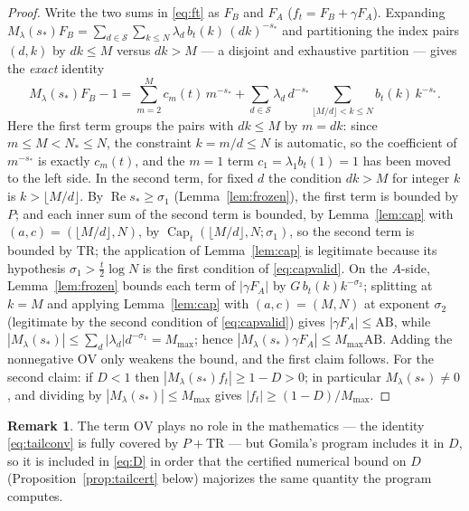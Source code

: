 \documentclass[11pt]{article}
\theoremstyle{definition}
\newtheorem{remark}[theorem]{Remark}
\newcommand{\calS}{\mathcal{S}}
\newcommand{\CapT}{\operatorname{Cap}}
\DeclareMathOperator{\Rea}{Re}
\begin{document}
\begin{proof}
Write the two sums in \eqref{eq:ft} as $F_B$ and $F_A$
($f_t=F_B+\gamma F_A$). Expanding
$M_\lambda(s_*)F_B=\sum_{d\in\calS}\sum_{k\le N}
\lambda_d\,b_t(k)\,(dk)^{-s_*}$ and partitioning the index pairs
$(d,k)$ by $dk\le M$ versus $dk>M$ --- a disjoint and exhaustive
partition --- gives the \emph{exact} identity
\begin{equation}\label{eq:tailconv}
M_\lambda(s_*)F_B-1
=\sum_{m=2}^{M}c_m(t)\,m^{-s_*}
+\sum_{d\in\calS}\lambda_d\,d^{-s_*}
\sum_{\lfloor M/d\rfloor<k\le N}b_t(k)\,k^{-s_*} .
\end{equation}
Here the first term groups the pairs with $dk\le M$ by $m=dk$: since
$m\le M<N_*\le N$, the constraint $k=m/d\le N$ is automatic, so the
coefficient of $m^{-s_*}$ is exactly $c_m(t)$, and the $m=1$ term
$c_1=\lambda_1b_t(1)=1$ has been moved to the left side. In the
second term, for fixed $d$ the condition $dk>M$ for integer $k$ is
$k>\lfloor M/d\rfloor$. By $\Rea s_*\ge\sigma_1$
(Lemma~\ref{lem:frozen}), the first term is bounded by $P$; and
each inner sum of the second term is bounded, by
Lemma~\ref{lem:cap} with $(a,c)=(\lfloor M/d\rfloor,N)$, by
$\CapT_t(\lfloor M/d\rfloor,N;\sigma_1)$, so the second term is
bounded by $\mathrm{TR}$; the application of Lemma~\ref{lem:cap} is
legitimate because its hypothesis $\sigma_1>\frac t2\log N$ is the
first condition of \eqref{eq:capvalid}. On the $A$-side,
Lemma~\ref{lem:frozen} bounds each term of $|\gamma F_A|$ by
$G\,b_t(k)k^{-\sigma_2}$; splitting at $k=M$ and applying
Lemma~\ref{lem:cap} with $(a,c)=(M,N)$ at exponent $\sigma_2$
(legitimate by the second condition of \eqref{eq:capvalid}) gives
$|\gamma F_A|\le\mathrm{AB}$, while
$|M_\lambda(s_*)|\le\sum_d|\lambda_d|d^{-\sigma_1}=M_{\max}$;
hence $|M_\lambda(s_*)\gamma F_A|\le M_{\max}\mathrm{AB}$. Adding
the nonnegative $\mathrm{OV}$ only weakens the bound, and the first
claim follows. For the second claim: if $D<1$ then
$|M_\lambda(s_*)f_t|\ge1-D>0$; in particular
$M_\lambda(s_*)\neq0$, and dividing by
$|M_\lambda(s_*)|\le M_{\max}$ gives
$|f_t|\ge(1-D)/M_{\max}$.
\end{proof}

\begin{remark}
The term $\mathrm{OV}$ plays no role in the mathematics --- the
identity \eqref{eq:tailconv} is fully covered by $P+\mathrm{TR}$ ---
but Gomila's program includes it in $D$, so it is included in
\eqref{eq:D} in order that the certified numerical bound on $D$
(Proposition~\ref{prop:tailcert} below) majorizes the same quantity
the program computes.
\end{remark}
\end{document}
